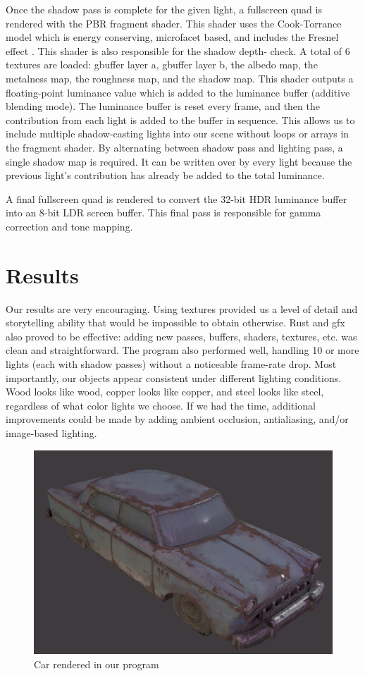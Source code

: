 \documentclass[12pt, letterpaper, twocolumn]{article}
\begin{document}
Once the shadow pass is complete for the given light, a fullscreen quad is
rendered with the PBR fragment shader. This shader uses the Cook-Torrance
model which is energy conserving, microfacet based, and includes the Fresnel
effect \cite{CoTor}. This shader is also responsible for the shadow depth-
check. A total of 6 textures are loaded: gbuffer layer a, gbuffer layer b, the
albedo map, the metalness map, the roughness map, and the shadow map. This
shader outputs a floating-point luminance value which is added to the
luminance buffer (additive blending mode). The luminance buffer is reset every
frame, and then the contribution from each light is added to the buffer in
sequence. This allows us to include multiple shadow-casting lights into our
scene without loops or arrays in the fragment shader. By alternating between
shadow pass and lighting pass, a single shadow map is required. It can be
written over by every light because the previous light’s contribution has
already be added to the total luminance.

A final fullscreen quad is rendered to convert the 32-bit HDR luminance buffer
into an 8-bit LDR screen buffer. This final pass is responsible for gamma
correction and tone mapping.

\section{Results}

Our results are very encouraging. Using textures provided us a level of detail
and storytelling ability that would be impossible to obtain otherwise. Rust
and gfx also proved to be effective: adding new passes, buffers, shaders,
textures, etc. was clean and straightforward. The program also performed well,
handling 10 or more lights (each with shadow passes) without a noticeable
frame-rate drop. Most importantly, our objects appear consistent under
different lighting conditions. Wood looks like wood, copper looks like copper,
and steel looks like steel, regardless of what color lights we choose.  If we
had the time, additional improvements could be made by adding ambient
occlusion, antialiasing, and/or image-based lighting.

\begin{figure}
\centering \includegraphics[width=0.5 \textwidth]{pbr_car_02.png}
\caption{Car rendered in our program}
\end{figure}
\end{document}
